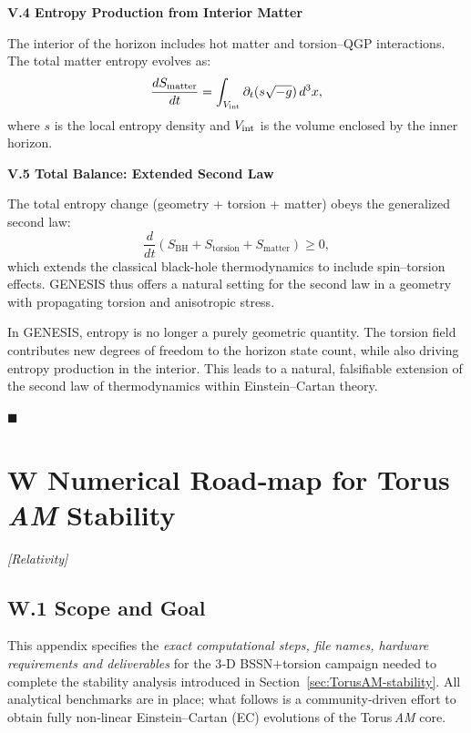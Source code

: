 \documentclass{article}
\newcommand{\grtag}{\textcolor{blue!40!black}{\textit{[Relativity]}}}
\begin{document}
\vspace{1em}
\noindent\textbf{V.4 Entropy Production from Interior Matter}

The interior of the horizon includes hot matter and torsion–QGP interactions. The total matter entropy evolves as:
\begin{equation}
\frac{dS_{\mathrm{matter}}}{dt} = \int_{V_{\rm int}} \partial_t(s \sqrt{-g}) \, d^3x,
\end{equation}
where $s$ is the local entropy density and $V_{\rm int}$ is the volume enclosed by the inner horizon.

\vspace{1em}
\noindent\textbf{V.5 Total Balance: Extended Second Law}

The total entropy change (geometry + torsion + matter) obeys the generalized second law:
\begin{equation}
\frac{d}{dt} (S_{\mathrm{BH}} + S_{\mathrm{torsion}} + S_{\mathrm{matter}}) \ge 0,
\end{equation}
which extends the classical black-hole thermodynamics to include spin–torsion effects. GENESIS thus offers a natural setting for the second law in a geometry with propagating torsion and anisotropic stress.

\begin{tcolorbox}[colback=gray!5, colframe=black!30, title=Why this matters]
In GENESIS, entropy is no longer a purely geometric quantity. The torsion field contributes new degrees of freedom to the horizon state count, while also driving entropy production in the interior. This leads to a natural, falsifiable extension of the second law of thermodynamics within Einstein–Cartan theory.
\end{tcolorbox}

\hfill$\blacksquare$








\section*{W  Numerical Road‑map for Torus \textit{AM} Stability}
\label{app:NumRoadmap}
\grtag


\subsection*{W.1  Scope and Goal}
This appendix specifies the \emph{exact computational steps, file names, 
hardware requirements and deliverables} for the 3‑D BSSN$+$torsion 
campaign needed to complete the stability analysis introduced in 
Section~\ref{sec:TorusAM-stability}.  
All analytical benchmarks are in place; what follows is a community‑driven 
effort to obtain fully non‑linear Einstein–Cartan (EC) evolutions of the 
Torus\,\textit{AM} core.
\end{document}
